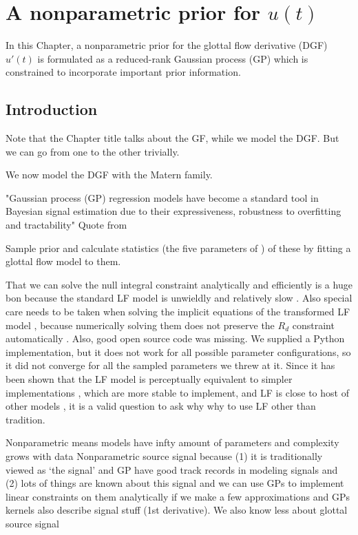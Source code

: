 \chapter{A nonparametric prior for $u(t)$\label{chapter:3}}

\begin{chaptersections}{%
In this Chapter, a nonparametric prior for the glottal flow derivative (DGF) $u'(t)$ is formulated as a reduced-rank Gaussian process (GP) which is constrained to incorporate important prior information.
}

\section{Introduction}


Note that the Chapter title talks about the GF, while we model the DGF.
But we can go from one to the other trivially.

We now model the DGF with the Matern family.

"Gaussian process (GP) regression models have become a standard tool in Bayesian signal estimation due to their expressiveness, robustness to overfitting and tractability" Quote from \citep{Tobar2015}

Sample prior and calculate statistics (the five parameters of \citep{Doval2006}) of these by fitting a glottal flow model to them.

That we can solve the null integral constraint analytically and efficiently is a huge bon because the standard LF model is unwieldly and relatively slow \cite{Perrotin2021}. Also special care needs to be taken when solving the implicit equations of the transformed LF model \cite{Fant1994,Fant1995}, because numerically solving them does not preserve the $R_d$ constraint automatically \cite{Gobl2017}. Also, good open source code was missing. We supplied a Python implementation, but it does not work for all possible parameter configurations, so it did not converge for all the sampled parameters we threw at it. Since it has been shown that the LF model is perceptually equivalent to simpler implementations \citep{Perrotin2021}, which are more stable to implement, and LF is close to host of other models \cite{Doval2006}, it is a valid question to ask why why to use LF other than tradition.

Nonparametric means models have infty amount of parameters
and complexity grows with data
Nonparametric source signal because (1) it is traditionally viewed as `the signal' and GP have good track records in modeling signals and (2) lots of things are known about this signal and we can use GPs to implement linear constraints on them analytically if we make a few approximations and GPs kernels also describe signal stuff (1st derivative).
We also know less about glottal source signal



\end{chaptersections}
